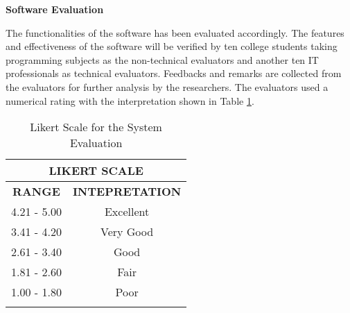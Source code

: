 \flushleft
\textbf{Software Evaluation}
\justifying

\parx
The functionalities of the software has been evaluated accordingly. The
features and effectiveness of the software will be verified by ten college
students taking programming subjects as the non-technical evaluators and another ten
IT professionals as technical evaluators. Feedbacks and remarks are collected from the
evaluators for further analysis by the researchers. The evaluators used a numerical
rating with the interpretation shown in Table \ref{table:ratings_scale}.

\begin{longtable}[c]{|c|c|}
\hline
\multicolumn{2}{|c|}{\textbf{LIKERT SCALE}} \\ \hline
\endfirsthead
%
\endhead
%
\textbf{RANGE}   & \textbf{INTEPRETATION}   \\ \hline
4.21 - 5.00      & Excellent                \\ \hline
3.41 - 4.20      & Very Good                \\ \hline
2.61 - 3.40      & Good                     \\ \hline
1.81 - 2.60      & Fair                     \\ \hline
1.00 - 1.80      & Poor                     \\ \hline
\caption{Likert Scale for the System Evaluation}
\label{table:ratings_scale}
\end{longtable}




